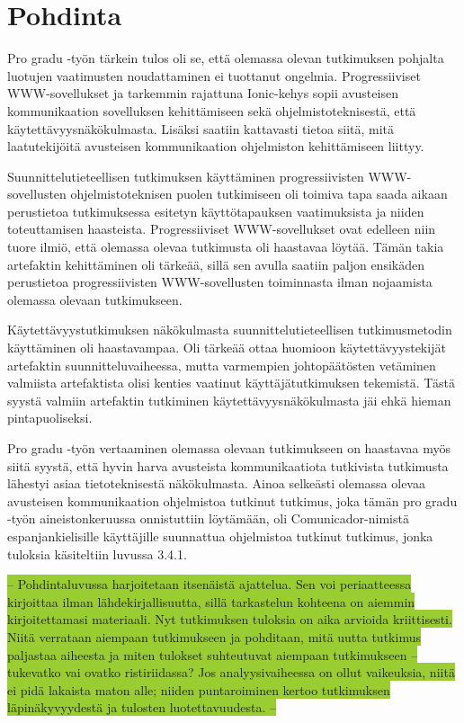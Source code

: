 \documentclass[utf8]{gradu3}
\begin{document}
\chapter{Pohdinta}

Pro gradu -työn tärkein tulos oli se, että olemassa olevan tutkimuksen pohjalta luotujen vaatimusten noudattaminen ei tuottanut ongelmia. Progressiiviset WWW-sovellukset ja tarkemmin rajattuna Ionic-kehys sopii avusteisen kommunikaation sovelluksen kehittämiseen sekä ohjelmistoteknisestä, että käytettävyysnäkökulmasta. Lisäksi saatiin kattavasti tietoa siitä, mitä laatutekijöitä avusteisen kommunikaation ohjelmiston kehittämiseen liittyy.

Suunnittelutieteellisen tutkimuksen käyttäminen progressiivisten WWW-sovellusten ohjelmistoteknisen puolen tutkimiseen oli toimiva tapa saada aikaan perustietoa tutkimuksessa esitetyn käyttötapauksen vaatimuksista ja niiden toteuttamisen haasteista. Progressiiviset WWW-sovellukset ovat edelleen niin tuore ilmiö, että olemassa olevaa tutkimusta oli haastavaa löytää. Tämän takia artefaktin kehittäminen oli tärkeää, sillä sen avulla saatiin paljon ensikäden perustietoa progressiivisten WWW-sovellusten toiminnasta ilman nojaamista olemassa olevaan tutkimukseen.

Käytettävyystutkimuksen näkökulmasta suunnittelutieteellisen tutkimusmetodin käyttäminen oli haastavampaa. Oli tärkeää ottaa huomioon käytettävyystekijät artefaktin suunnitteluvaiheessa, mutta varmempien johtopäätösten vetäminen valmiista artefaktista olisi kenties vaatinut käyttäjätutkimuksen tekemistä. Tästä syystä valmiin artefaktin tutkiminen käytettävyysnäkökulmasta jäi ehkä hieman pintapuoliseksi.

Pro gradu -työn vertaaminen olemassa olevaan tutkimukseen on haastavaa myös siitä syystä, että hyvin harva avusteista kommunikaatiota tutkivista tutkimusta lähestyi asiaa tietoteknisestä näkökulmasta. Ainoa selkeästi olemassa olevaa avusteisen kommunikaation ohjelmistoa tutkinut tutkimus, joka tämän pro gradu -työn aineistonkeruussa onnistuttiin löytämään, oli Comunicador-nimistä espanjankielisille käyttäjille suunnattua ohjelmistoa tutkinut tutkimus, jonka tuloksia käsiteltiin luvussa 3.4.1.

\colorbox{YellowGreen}{-- Pohdintaluvussa harjoitetaan itsenäistä ajattelua. Sen voi periaatteessa kirjoittaa ilman lähdekirjallisuutta, sillä tarkastelun kohteena on aiemmin kirjoitettamasi materiaali. Nyt tutkimuksen tuloksia on aika arvioida kriittisesti. Niitä verrataan aiempaan tutkimukseen ja pohditaan, mitä uutta tutkimus paljastaa aiheesta ja miten tulokset suhteutuvat aiempaan tutkimukseen – tukevatko vai ovatko ristiriidassa? Jos analyysivaiheessa on ollut vaikeuksia, niitä ei pidä lakaista maton alle; niiden puntaroiminen kertoo tutkimuksen läpinäkyvyydestä ja tulosten luotettavuudesta. --}
\end{document}
